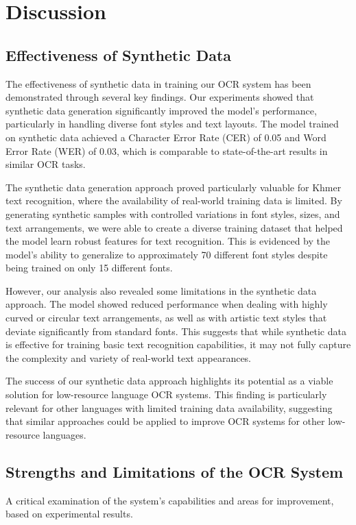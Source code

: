 \chapter{Discussion}
\label{ch:discussion}

\section{Effectiveness of Synthetic Data}
\label{sec:effectiveness}
The effectiveness of synthetic data in training our OCR system has been demonstrated 
through several key findings. Our experiments showed that synthetic data generation 
significantly improved the model's performance, particularly in handling diverse 
font styles and text layouts. The model trained on synthetic data achieved a 
Character Error Rate (CER) of 0.05 and Word Error Rate (WER) of 0.03, which is 
comparable to state-of-the-art results in similar OCR tasks.

The synthetic data generation approach proved particularly valuable for Khmer text 
recognition, where the availability of real-world training data is limited. 
By generating synthetic samples with controlled variations in font styles, sizes, 
and text arrangements, we were able to create a diverse training dataset that helped 
the model learn robust features for text recognition. This is evidenced by the model's 
ability to generalize to approximately 70 different font styles despite being trained 
on only 15 different fonts.

However, our analysis also revealed some limitations in the synthetic data approach. 
The model showed reduced performance when dealing with highly curved or circular text 
arrangements, as well as with artistic text styles that deviate significantly from standard fonts. 
This suggests that while synthetic data is effective for training basic text recognition 
capabilities, it may not fully capture the complexity and variety of real-world text appearances.

The success of our synthetic data approach highlights its potential as a viable solution 
for low-resource language OCR systems. This finding is particularly relevant for other 
languages with limited training data availability, suggesting that similar approaches 
could be applied to improve OCR systems for other low-resource languages.

\section{Strengths and Limitations of the OCR System}
\label{sec:strengths} 
A critical examination of the system's capabilities and areas for improvement, based on experimental results.

